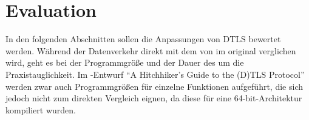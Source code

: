 \chapter{Evaluation}

In den folgenden Abschnitten sollen die Anpassungen von DTLS bewertet werden. Während der Datenverkehr direkt mit dem von
 im original verglichen wird, geht es bei der Programmgröße und der Dauer des  um die Praxistauglichkeit.
Im -Entwurf "`A Hitchhiker's Guide to the (D)TLS Protocol"' \cite{draftmintls} werden zwar auch Programmgrößen für einzelne
Funktionen aufgeführt, die sich jedoch nicht zum direkten Vergleich eignen, da diese für eine 64-bit-Architektur kompiliert wurden.



